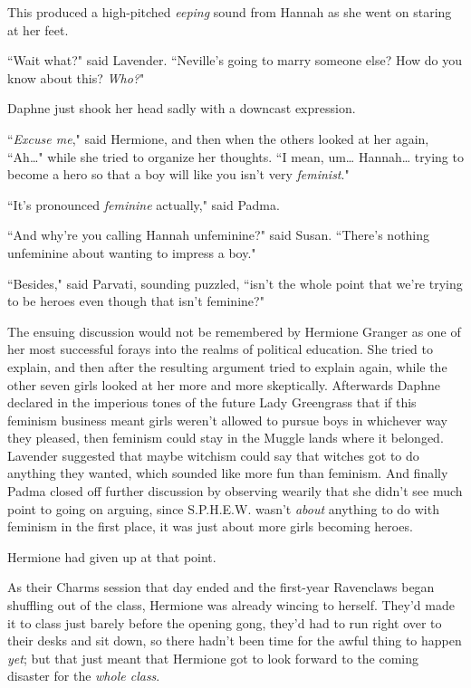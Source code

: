 This produced a high-pitched \emph{eeping} sound from Hannah as she went on staring at her feet.

``Wait what?" said Lavender. ``Neville's going to marry someone else? How do you know about this? \emph{Who?}"

Daphne just shook her head sadly with a downcast expression.

``\emph{Excuse me}," said Hermione, and then when the others looked at her again, ``Ah{\ldots}" while she tried to organize her thoughts. ``I mean, um{\ldots} Hannah{\ldots} trying to become a hero so that a boy will like you isn't very \emph{feminist}."

``It's pronounced \emph{feminine} actually," said Padma.

``And why're you calling Hannah unfeminine?" said Susan. ``There's nothing unfeminine about wanting to impress a boy."

``Besides," said Parvati, sounding puzzled, ``isn't the whole point that we're trying to be heroes even though that isn't feminine?"

The ensuing discussion would not be remembered by Hermione Granger as one of her most successful forays into the realms of political education. She tried to explain, and then after the resulting argument tried to explain again, while the other seven girls looked at her more and more skeptically. Afterwards Daphne declared in the imperious tones of the future Lady Greengrass that if this feminism business meant girls weren't allowed to pursue boys in whichever way they pleased, then feminism could stay in the Muggle lands where it belonged. Lavender suggested that maybe witchism could say that witches got to do anything they wanted, which sounded like more fun than feminism. And finally Padma closed off further discussion by observing wearily that she didn't see much point to going on arguing, since S.P.H.E.W. wasn't \emph{about} anything to do with feminism in the first place, it was just about more girls becoming heroes.

Hermione had given up at that point.

\later

As their Charms session that day ended and the first-year Ravenclaws began shuffling out of the class, Hermione was already wincing to herself. They'd made it to class just barely before the opening gong, they'd had to run right over to their desks and sit down, so there hadn't been time for the awful thing to happen \emph{yet}; but that just meant that Hermione got to look forward to the coming disaster for the \emph{whole class}.

